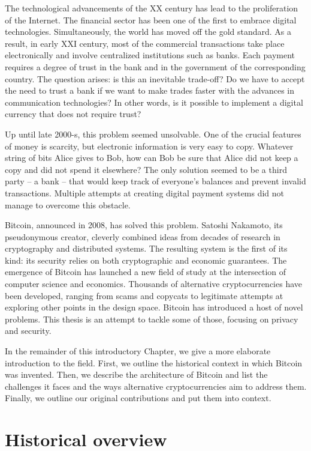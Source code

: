 The technological advancements of the XX century has lead to the proliferation of the Internet.
The financial sector has been one of the first to embrace digital technologies.
Simultaneously, the world has moved off the gold standard.
As a result, in early XXI century, most of the commercial transactions take place electronically and involve centralized institutions such as banks.
Each payment requires a degree of trust in the bank and in the government of the corresponding country.
The question arises: is this an inevitable trade-off?
Do we have to accept the need to trust a bank if we want to make trades faster with the advances in communication technologies?
In other words, is it possible to implement a digital currency that does not require trust?

Up until late 2000-s, this problem seemed unsolvable.
One of the crucial features of money is scarcity, but electronic information is very easy to copy.
Whatever string of bits Alice gives to Bob, how can Bob be sure that Alice did not keep a copy and did not spend it elsewhere?
The only solution seemed to be a third party -- a bank -- that would keep track of everyone's balances and prevent invalid transactions.
Multiple attempts at creating digital payment systems did not manage to overcome this obstacle.

Bitcoin, announced in 2008, has solved this problem.
Satoshi Nakamoto, its pseudonymous creator, cleverly combined ideas from decades of research in cryptography and distributed systems.
The resulting system is the first of its kind: its security relies on both cryptographic and economic guarantees.
The emergence of Bitcoin has launched a new field of study at the intersection of computer science and economics.
Thousands of alternative cryptocurrencies have been developed, ranging from scams and copycats to legitimate attempts at exploring other points in the design space.
Bitcoin has introduced a host of novel problems.
This thesis is an attempt to tackle some of those, focusing on privacy and security.

In the remainder of this introductory Chapter, we give a more elaborate introduction to the field.
First, we outline the historical context in which Bitcoin was invented.
Then, we describe the architecture of Bitcoin and list the challenges it faces and the ways alternative cryptocurrencies aim to address them.
Finally, we outline our original contributions and put them into context.


\section{Historical overview}


